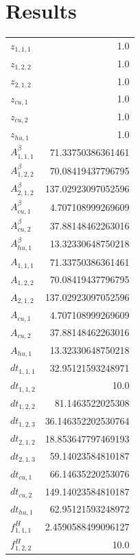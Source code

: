 \documentclass{article}%
\makeatletter
\let\mcnewpage=\newpage%
\newcommand{\TrickSupertabularIntoMulticols}{%
\renewcommand\newpage{%
\if@firstcolumn%
\hrule width\linewidth height0pt%
\columnbreak%
\else%
\mcnewpage%
\fi%
}%
}%
\makeatother
\begin{document}
\section{Results}%
\thispagestyle{plain}%
\begin{multicols*}{3}%
\TrickSupertabularIntoMulticols%
%
\begin{supertabular}{lr}%
	$z_{1,1,1}$ & 1.0 \\%
	$z_{1,2,2}$ & 1.0 \\%
	$z_{2,1,2}$ & 1.0 \\%
	$z_{cu,1}$ & 1.0 \\%
	$z_{cu,2}$ & 1.0 \\%
	$z_{hu,1}$ & 1.0 \\%
	$A_{1,1,1}^{\beta}$ & 71.33750386361461 \\%
	$A_{1,2,2}^{\beta}$ & 70.08419437796795 \\%
	$A_{2,1,2}^{\beta}$ & 137.02923097052596 \\%
	$A_{cu,1}^{\beta}$ & 4.707108999269609 \\%
	$A_{cu,2}^{\beta}$ & 37.88148462263016 \\%
	$A_{hu,1}^{\beta}$ & 13.32330648750218 \\%
	$A_{1,1,1}$ & 71.33750386361461 \\%
	$A_{1,2,2}$ & 70.08419437796795 \\%
	$A_{2,1,2}$ & 137.02923097052596 \\%
	$A_{cu,1}$ & 4.707108999269609 \\%
	$A_{cu,2}$ & 37.88148462263016 \\%
	$A_{hu,1}$ & 13.32330648750218 \\%
	$dt_{1,1,1}$ & 32.95121593248971 \\%
	$dt_{1,1,2}$ & 10.0 \\%
	$dt_{1,2,2}$ & 81.1463522025308 \\%
	$dt_{1,2,3}$ & 36.146352202530764 \\%
	$dt_{2,1,2}$ & 18.853647797469193 \\%
	$dt_{2,1,3}$ & 59.14023584810187 \\%
	$dt_{cu,1}$ & 66.14635220253076 \\%
	$dt_{cu,2}$ & 149.14023584810187 \\%
	$dt_{hu,1}$ & 62.95121593248972 \\%
	$f_{1,1,1}^{H}$ & 2.4590588499096127 \\%
	$f_{1,2,2}^{H}$ & 10.0 \\%

\end{supertabular}
\end{multicols*}
\end{document}
